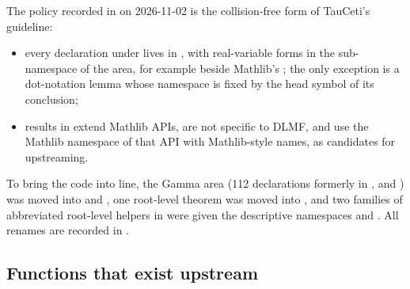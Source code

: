 \documentclass[11pt,a4paper]{article}
\begin{document}
The policy recorded in  on 2026-11-02 is the collision-free form of
TauCeti's guideline:
\begin{itemize}
  \item every declaration under  lives in , with real-variable
    forms in the  sub-namespace of the area, for example
     beside Mathlib's ; the only exception
    is a dot-notation lemma whose namespace is fixed by the head symbol of its conclusion;
  \item results in  extend Mathlib APIs, are not specific to DLMF, and use
    the Mathlib namespace of that API with Mathlib-style names, as candidates for
    upstreaming.
\end{itemize}
To bring the code into line, the Gamma area (112 declarations formerly in ,
 and ) was moved into  and
, one root-level theorem was moved into , and
two families of abbreviated root-level helpers in  were given the
descriptive namespaces  and . All renames are
recorded in .

\subsection{Functions that exist upstream}
\end{document}
